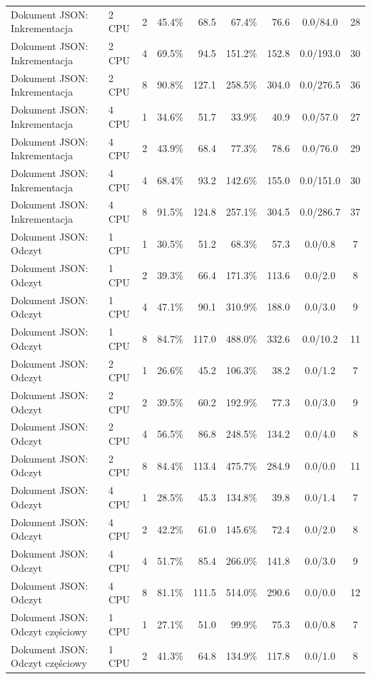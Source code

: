 \begin{table}[ht]
{\begin{tabular}{llcrrrrcc}
Dokument JSON: Inkrementacja & 2 CPU & 2 & 45.4\% & 68.5 & 67.4\% & 76.6 & 0.0/84.0 & 28 \\
Dokument JSON: Inkrementacja & 2 CPU & 4 & 69.5\% & 94.5 & 151.2\% & 152.8 & 0.0/193.0 & 30 \\
Dokument JSON: Inkrementacja & 2 CPU & 8 & 90.8\% & 127.1 & 258.5\% & 304.0 & 0.0/276.5 & 36 \\
Dokument JSON: Inkrementacja & 4 CPU & 1 & 34.6\% & 51.7 & 33.9\% & 40.9 & 0.0/57.0 & 27 \\
Dokument JSON: Inkrementacja & 4 CPU & 2 & 43.9\% & 68.4 & 77.3\% & 78.6 & 0.0/76.0 & 29 \\
Dokument JSON: Inkrementacja & 4 CPU & 4 & 68.4\% & 93.2 & 142.6\% & 155.0 & 0.0/151.0 & 30 \\
Dokument JSON: Inkrementacja & 4 CPU & 8 & 91.5\% & 124.8 & 257.1\% & 304.5 & 0.0/286.7 & 37 \\
Dokument JSON: Odczyt & 1 CPU & 1 & 30.5\% & 51.2 & 68.3\% & 57.3 & 0.0/0.8 & 7 \\
Dokument JSON: Odczyt & 1 CPU & 2 & 39.3\% & 66.4 & 171.3\% & 113.6 & 0.0/2.0 & 8 \\
Dokument JSON: Odczyt & 1 CPU & 4 & 47.1\% & 90.1 & 310.9\% & 188.0 & 0.0/3.0 & 9 \\
Dokument JSON: Odczyt & 1 CPU & 8 & 84.7\% & 117.0 & 488.0\% & 332.6 & 0.0/10.2 & 11 \\
Dokument JSON: Odczyt & 2 CPU & 1 & 26.6\% & 45.2 & 106.3\% & 38.2 & 0.0/1.2 & 7 \\
Dokument JSON: Odczyt & 2 CPU & 2 & 39.5\% & 60.2 & 192.9\% & 77.3 & 0.0/3.0 & 9 \\
Dokument JSON: Odczyt & 2 CPU & 4 & 56.5\% & 86.8 & 248.5\% & 134.2 & 0.0/4.0 & 8 \\
Dokument JSON: Odczyt & 2 CPU & 8 & 84.4\% & 113.4 & 475.7\% & 284.9 & 0.0/0.0 & 11 \\
Dokument JSON: Odczyt & 4 CPU & 1 & 28.5\% & 45.3 & 134.8\% & 39.8 & 0.0/1.4 & 7 \\
Dokument JSON: Odczyt & 4 CPU & 2 & 42.2\% & 61.0 & 145.6\% & 72.4 & 0.0/2.0 & 8 \\
Dokument JSON: Odczyt & 4 CPU & 4 & 51.7\% & 85.4 & 266.0\% & 141.8 & 0.0/3.0 & 9 \\
Dokument JSON: Odczyt & 4 CPU & 8 & 81.1\% & 111.5 & 514.0\% & 290.6 & 0.0/0.0 & 12 \\
Dokument JSON: Odczyt częściowy & 1 CPU & 1 & 27.1\% & 51.0 & 99.9\% & 75.3 & 0.0/0.8 & 7 \\
Dokument JSON: Odczyt częściowy & 1 CPU & 2 & 41.3\% & 64.8 & 134.9\% & 117.8 & 0.0/1.0 & 8 \\

\end{tabular}}
\end{table}
